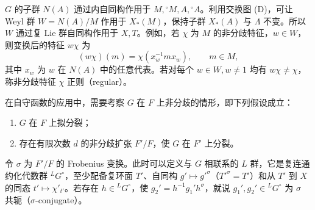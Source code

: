 $G$ 的子群 $N(A)$ 通过内自同构作用于 $M,{}^\circ M,A,{}^\circ A$。利用交换图 (D)，可让 Weyl 群 $W=N(A)/M$ 作用于 $X_*(M)$，保持子群 $X_*(A)$ 与 $\Lambda$ 不变。所以 $W$ 通过复 Lie 群自同构作用于 $X,T$。例如，若 $\chi$ 为 $M$ 的非分歧特征，$w\in W$，则变换后的特征 $w\chi$ 为
\[
(w\chi)(m)=\chi(x_w^{-1}mx_w),\qquad m\in M,\tag{5}
\]
其中 $x_w$ 为 $w$ 在 $N(A)$ 中的任意代表。若对每个 $w\in W,w\ne1$ 均有 $w\chi\ne\chi$，称非分歧特征 $\chi$ 正则（regular）。

在自守函数的应用中，需要考察 $G$ 在 $F$ 上非分歧的情形，即下列假设成立：
\begin{enumerate}
\item[(a)] $G$ 在 $F$ 上拟分裂；
\item[(b)] 存在有限次数 $d$ 的非分歧扩张 $F'/F$，使 $G$ 在 $F'$ 上分裂。
\end{enumerate}
令 $\sigma$ 为 $F'/F$ 的 Frobenius 变换。此时可以定义与 $G$ 相联系的 $L$ 群，它是复连通约化代数群 $^LG^\circ$，至少配备复环面 $T'$、自同构 $g'\mapsto g'^\sigma$（$T'^\sigma=T'$）和从 $T'$ 到 $X$ 的同态 $t'\mapsto\chi'_{t'}$。若存在 $h\in{}^LG^\circ$，使 $g_2'=h^{-1}g_1'h^\sigma$，就说 $g_1',g_2'\in{}^LG^\circ$ 为 $\sigma$ 共轭（$\sigma$-conjugate）。

